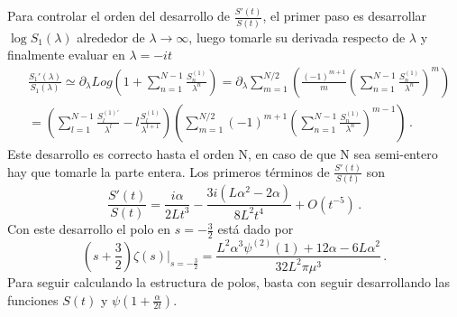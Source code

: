 Para controlar el orden del desarrollo de $ \frac{S' ( t)}{ S ( t)} $, el primer paso es desarrollar $\log S _1 (\lambda)$ alrededor de $\lambda \rightarrow \infty$, luego tomarle su derivada respecto de $\lambda$ y finalmente evaluar en $\lambda = -i t$
\begin{align}
&
\nonumber
	\frac{S _1 '( \lambda)}{S _1 ( \lambda )} 
	\simeq 
	\partial _{\lambda} Log \left(
						1 + \sum _{n=1} ^{N-1}  \frac{S ^{(1)} _n}{\lambda ^n}
						\right) =
\partial _{\lambda} 
\sum _{m = 1} ^{N/2} 
	\left(
	\frac{(-1) ^{m+1} }{m}
	\left(
		\sum _{n=1} ^{N-1} \frac{S ^{(1)} _n}{\lambda ^n}
		\right) ^m 
	\right)  \\[10pt]
	&=
\left(								
	\sum _{l = 1} ^{N-1} 
	\frac{S  ^{(1) '} _l}{\lambda ^l} - l \frac{S ^{(1)}  _l}{\lambda ^{l+1}}
	\right)							
\left(
	\sum _{m = 1} ^{N/2} (-1) ^{m+1} 
	\left(
			\sum _{n=1} ^{N-1} \frac{S ^{(1)} _n}{\lambda ^n}
			\right) ^{m-1}		
	\right)
\, .
\end{align}	
Este desarrollo  es correcto hasta el orden N, en caso de que N sea semi-entero hay que tomarle la parte entera. Los primeros términos de $\frac{S'(t)}{S(t)}$ son
\begin{equation}
\frac{S'(t)}{S(t)} = 
\frac{i \alpha}{2 L t^3} -
\frac{3 i (L \alpha ^2 - 2 \alpha)}{8 L^2 t ^4}
+ O (t ^{-5}) 
\, .
\end{equation}
Con este desarrollo el polo en $s=-\frac{3}{2}$ está dado por 
\begin{equation}
\left( s+ \frac{3}{2} \right)
\zeta  (s) \Big| _{s = - \frac{3}{2}}= 
\frac{L ^2 \alpha  ^3 \psi ^{(2)} (1) + 12   \alpha  - 6 L \alpha ^2}{32 L^2 \pi \mu ^3}
\, .
\end{equation}
Para seguir calculando la estructura de polos, basta con seguir desarrollando las funciones $S(t)$ y $\psi (1 + \frac{\alpha}{2 t})$.



